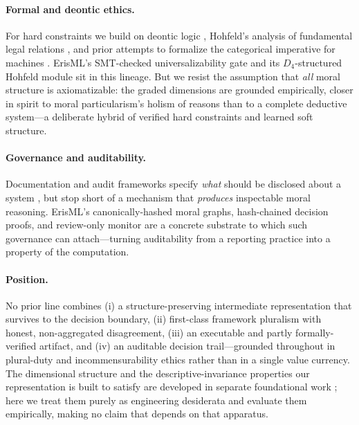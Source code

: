 \paragraph{Formal and deontic ethics.}
For hard constraints we build on deontic logic \citep{vonwright1951,horty2001}, Hohfeld's
analysis of fundamental legal relations \citep{hohfeld1917}, and prior attempts to formalize
the categorical imperative for machines \citep{powers2006,lindner2019}. ErisML's SMT-checked
universalizability gate and its $D_4$-structured Hohfeld module sit in this lineage. But we
resist the assumption that \emph{all} moral structure is axiomatizable: the graded
dimensions are grounded empirically, closer in spirit to moral particularism's holism of
reasons \citep{dancy2004} than to a complete deductive system---a deliberate hybrid of
verified hard constraints and learned soft structure.

\paragraph{Governance and auditability.}
Documentation and audit frameworks specify \emph{what} should be disclosed about a system
\citep{mitchell2019,raji2020,nist2023}, but stop short of a mechanism that \emph{produces}
inspectable moral reasoning. ErisML's canonically-hashed moral graphs, hash-chained decision
proofs, and review-only monitor are a concrete substrate to which such governance can
attach---turning auditability from a reporting practice into a property of the computation.

\paragraph{Position.}
No prior line combines (i) a structure-preserving intermediate representation that survives
to the decision boundary, (ii) first-class framework pluralism with honest, non-aggregated
disagreement, (iii) an executable and partly formally-verified artifact, and (iv) an
auditable decision trail---grounded throughout in plural-duty and incommensurability ethics
rather than in a single value currency. The dimensional structure and the
descriptive-invariance properties our representation is built to satisfy are developed in
separate foundational work \citep{bond_geometric_ethics}; here we treat them purely as
engineering desiderata and evaluate them empirically, making no claim that depends on that
apparatus.

